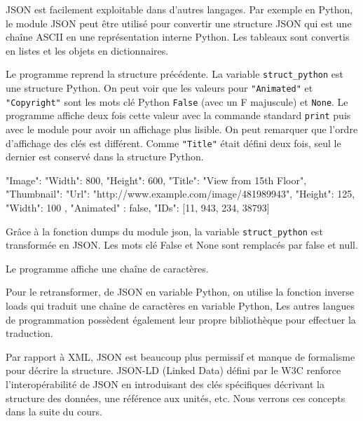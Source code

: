 JSON est facilement exploitable dans d’autres langages. Par exemple en Python, le module JSON peut être utilisé pour convertir une structure JSON qui est une chaîne ASCII en une représentation interne Python. Les tableaux sont convertis en listes et les objets en dictionnaires.

     \vspace{1em}

Le programme  reprend la structure précédente. La variable \texttt{struct_python} est une structure Python. On peut voir que les valeurs pour \texttt{"Animated"} et \texttt{"Copyright"} sont les mots clé Python \texttt{False} (avec un F majuscule) et \texttt{None}. Le programme affiche deux fois cette valeur avec la commande standard \texttt{print} puis avec le module  pour avoir un affichage plus lisible. On peut remarquer que l'ordre d'affichage des clés est différent. Comme \texttt{"Title"} était défini deux fois, seul le dernier est conservé dans la structure Python.

\begin{termc}[backgroundcolor=\color{gray!10}, language=json]
{
"Image": {
      "Width": 800,
      "Height": 600,
      "Title": "View from 15th Floor",
      "Thumbnail": {   
           "Url": "http://www.example.com/image/481989943",
           "Height": 125,
           "Width": 100
       },
       "Animated" : false,
       "IDs": [11, 943, 234, 38793]
    }
}
\end{termc}

Grâce à la fonction dumps du module json, la variable \texttt{struct\_python} est transformée en JSON. Les mots clé False et None sont remplacés par false et null. 

Le programme affiche une chaîne de caractères.

Pour le retransformer, de JSON en variable Python, on utilise la fonction inverse loads qui traduit une chaîne de caractères en variable Python, Les autres langues de programmation possèdent également leur propre bibliothèque pour effectuer la traduction.

Par rapport à XML, JSON est beaucoup plus permissif et manque de formalisme pour décrire la structure. JSON-LD (Linked Data) défini par le W3C renforce l’interopérabilité de JSON en introduisant des clés spécifiques décrivant la structure des données, une référence aux unités, etc. Nous verrons ces concepts dans la suite du cours.

